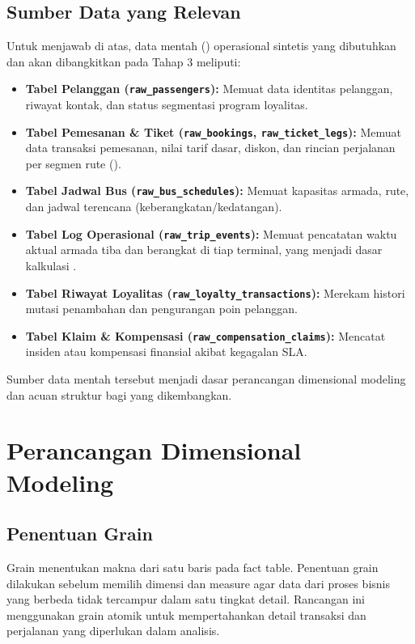 \subsection{Sumber Data yang Relevan}
Untuk menjawab  di atas, data mentah () operasional sintetis yang dibutuhkan dan akan dibangkitkan pada Tahap 3 meliputi:
\begin{itemize}
    \item \textbf{Tabel Pelanggan (\texttt{raw\_passengers}):} Memuat data identitas pelanggan, riwayat kontak, dan status segmentasi program loyalitas.
    \item \textbf{Tabel Pemesanan \& Tiket (\texttt{raw\_bookings}, \texttt{raw\_ticket\_legs}):} Memuat data transaksi pemesanan, nilai tarif dasar, diskon, dan rincian perjalanan per segmen rute ().
    \item \textbf{Tabel Jadwal Bus (\texttt{raw\_bus\_schedules}):} Memuat kapasitas armada, rute, dan jadwal terencana (keberangkatan/kedatangan).
    \item \textbf{Tabel Log Operasional (\texttt{raw\_trip\_events}):} Memuat pencatatan waktu aktual armada tiba dan berangkat di tiap terminal, yang menjadi dasar kalkulasi .
    \item \textbf{Tabel Riwayat Loyalitas (\texttt{raw\_loyalty\_transactions}):} Merekam histori mutasi penambahan dan pengurangan poin pelanggan.
    \item \textbf{Tabel Klaim \& Kompensasi (\texttt{raw\_compensation\_claims}):} Mencatat insiden  atau kompensasi finansial akibat kegagalan SLA.
\end{itemize}
Sumber data mentah tersebut menjadi dasar perancangan dimensional modeling dan
acuan struktur bagi  yang dikembangkan.

\section{Perancangan Dimensional Modeling}
\subsection{Penentuan Grain}

Grain menentukan makna dari satu baris pada fact table. Penentuan grain dilakukan
sebelum memilih dimensi dan measure agar data dari proses bisnis yang berbeda tidak
tercampur dalam satu tingkat detail. Rancangan ini menggunakan grain atomik untuk
mempertahankan detail transaksi dan perjalanan yang diperlukan dalam analisis.

